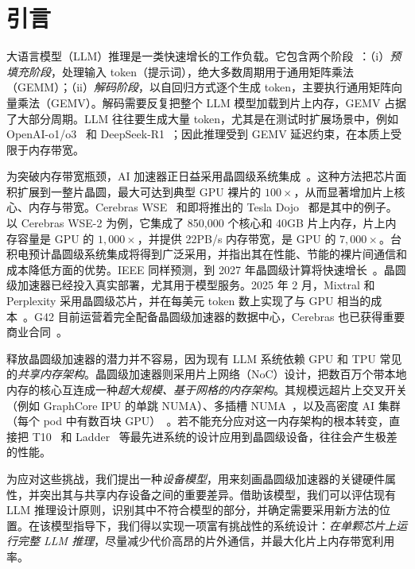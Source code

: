 \section{引言}
\vspace{-0.3cm}

大语言模型（LLM）推理是一类快速增长的工作负载。它包含两个阶段~\cite{flashdecoding++}：（i）\textit{预填充阶段}，处理输入 token（提示词），绝大多数周期用于通用矩阵乘法（GEMM）；（ii）\textit{解码阶段}，以自回归方式逐个生成 token，主要执行通用矩阵向量乘法（GEMV）。解码需要反复把整个 LLM 模型加载到片上内存，GEMV 占据了大部分周期。LLM 往往要生成大量 token，尤其是在测试时扩展场景中，例如 OpenAI-o1/o3~\cite{openaio1,openaio3} 和 DeepSeek-R1~\cite{deepseekr1}；因此推理受到 GEMV 延迟约束，在本质上受限于内存带宽。

为突破内存带宽瓶颈，AI 加速器正日益采用晶圆级系统集成~\cite{tsmc-advanced-packaging}。这种方法把芯片面积扩展到一整片晶圆，最大可达到典型 GPU 裸片的 $100\times$，从而显著增加片上核心、内存与带宽。Cerebras WSE~\cite{wse} 和即将推出的 Tesla Dojo~\cite{dojo} 都是其中的例子。以 Cerebras WSE-2 为例，它集成了 850,000 个核心和 40GB 片上内存，片上内存容量是 GPU 的 $1{,}000\times$，并提供 22PB/s 内存带宽，是 GPU 的 $7{,}000\times$。台积电预计晶圆级系统集成将得到广泛采用，并指出其在性能、节能的裸片间通信和成本降低方面的优势。IEEE 同样预测，到 2027 年晶圆级计算将快速增长~\cite{tsmc-advanced-packaging}。晶圆级加速器已经投入真实部署，尤其用于模型服务。2025 年 2 月，Mixtral 和 Perplexity 采用晶圆级芯片，并在每美元 token 数上实现了与 GPU 相当的成本~\cite{perplexity,mistra}。G42 目前运营着完全配备晶圆级加速器的数据中心，Cerebras 也已获得重要商业合同~\cite{g42}。

释放晶圆级加速器的潜力并不容易，因为现有 LLM 系统依赖 GPU 和 TPU 常见的\emph{共享内存架构}。晶圆级加速器则采用片上网络（NoC）设计，把数百万个带本地内存的核心互连成一种\emph{超大规模、基于网格的内存架构}。其规模远超片上交叉开关（例如 GraphCore IPU 的单跳 NUMA）、多插槽 NUMA~\cite{amd2023numa}，以及高密度 AI 集群（每个 pod 中有数百块 GPU）~\cite{tpu}。若不能充分应对这一内存架构的根本转变，直接把 T10~\cite{t10} 和 Ladder~\cite{ladder} 等最先进系统的设计应用到晶圆级设备，往往会产生极差的性能。

为应对这些挑战，我们提出一种\emph{设备模型}，用来刻画晶圆级加速器的关键硬件属性，并突出其与共享内存设备之间的重要差异。借助该模型，我们可以评估现有 LLM 推理设计原则，识别其中不符合模型的部分，并确定需要采用新方法的位置。在该模型指导下，我们得以实现一项富有挑战性的系统设计：\emph{在单颗芯片上运行完整 LLM 推理}，尽量减少代价高昂的片外通信，并最大化片上内存带宽利用率。

